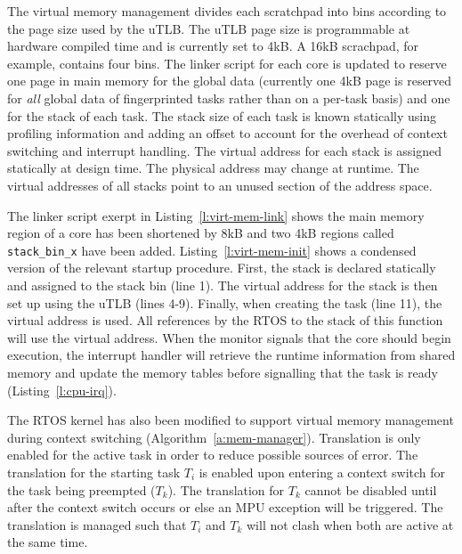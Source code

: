 	The virtual memory management divides each scratchpad into bins according to the page size used by the uTLB. 
	The uTLB page size is programmable at hardware compiled time and is currently set to 4kB. 
	A 16kB scrachpad, for example, contains four bins.  
	The linker script for each core is updated to reserve one page in main memory for the global data (currently one 4kB page is reserved for \emph{all} global data of fingerprinted tasks rather than on a per-task basis) and one for the stack of each task. 
	The stack size of each task is known statically using profiling information and adding an offset to account for the overhead of context switching and interrupt handling. 
	The virtual address for each stack is assigned statically at design time. 
	The physical address may change at runtime. 
	The virtual addresses of all stacks point to an unused section of the address space.

	The linker script exerpt in Listing~\ref{l:virt-mem-link} shows the main memory region of a core has been shortened by 8kB and two 4kB regions called \texttt{stack\_bin\_x} have been added. 
	Listing~\ref{l:virt-mem-init} shows a condensed version of the relevant startup procedure. 
	First, the stack is declared statically and assigned to the stack bin (line 1). 
	The virtual address for the stack is then set up using the uTLB (lines 4-9). 
	Finally, when creating the task (line 11), the virtual address is used. 
	All references by the RTOS to the stack of this function will use the virtual address. 
	When the monitor signals that the core should begin execution, the interrupt handler will retrieve the runtime information from shared memory and update the memory tables before signalling that the task is ready (Listing~\ref{l:cpu-irq}).



	The RTOS kernel has also been modified to support virtual memory management during context switching (Algorithm~\ref{a:mem-manager}). 
	Translation is only enabled for the active task in order to reduce possible sources of error. 
	The translation for the starting task $T_i$ is enabled upon entering a context switch for the task being preempted ($T_k$). 
	The translation for $T_k$ cannot be disabled until after the context switch occurs or else an MPU exception will be triggered. 
	The translation is managed such that $T_i$ and $T_k$ will not clash when both are active at the same time.

